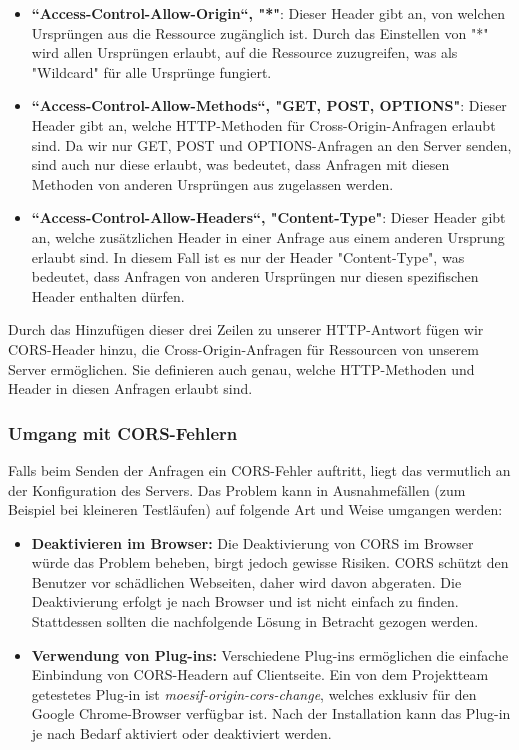 \begin{itemize}
    \item \textbf{``Access-Control-Allow-Origin``, "*"}: Dieser Header gibt an, von welchen Ursprüngen aus die Ressource zugänglich ist. Durch das Einstellen von "*" wird allen Ursprüngen erlaubt, auf die Ressource zuzugreifen, was als "Wildcard" für alle Ursprünge fungiert.
    \item \textbf{``Access-Control-Allow-Methods``, "GET, POST, OPTIONS"}: Dieser Header gibt an, welche HTTP-Methoden für Cross-Origin-Anfragen erlaubt sind. Da wir nur GET, POST und OPTIONS-Anfragen an den Server senden, sind auch nur diese erlaubt, was bedeutet, dass Anfragen mit diesen Methoden von anderen Ursprüngen aus zugelassen werden.
    \item \textbf{``Access-Control-Allow-Headers``, "Content-Type"}: Dieser Header gibt an, welche zusätzlichen Header in einer Anfrage aus einem anderen Ursprung erlaubt sind. In diesem Fall ist es nur der Header "Content-Type", was bedeutet, dass Anfragen von anderen Ursprüngen nur diesen spezifischen Header enthalten dürfen.
\end{itemize}

Durch das Hinzufügen dieser drei Zeilen zu unserer HTTP-Antwort fügen wir CORS-Header hinzu, die Cross-Origin-Anfragen für Ressourcen von unserem Server ermöglichen. Sie definieren auch genau, welche HTTP-Methoden und Header in diesen Anfragen erlaubt sind.

\subsubsection*{Umgang mit CORS-Fehlern}
Falls beim Senden der Anfragen ein CORS-Fehler auftritt, liegt das vermutlich an der Konfiguration des Servers. Das Problem kann in Ausnahmefällen (zum Beispiel bei kleineren Testläufen) auf folgende Art und Weise umgangen werden:

\begin{itemize}
    \item \textbf{Deaktivieren im Browser:} Die Deaktivierung von CORS im Browser würde das Problem beheben, birgt jedoch gewisse Risiken. CORS schützt den Benutzer vor schädlichen Webseiten, daher wird davon abgeraten. Die Deaktivierung erfolgt je nach Browser und ist nicht einfach zu finden. Stattdessen sollten die nachfolgende Lösung in Betracht gezogen werden.
    \item \textbf{Verwendung von Plug-ins:} Verschiedene Plug-ins ermöglichen die einfache Einbindung von CORS-Headern auf Clientseite. Ein von dem Projektteam getestetes Plug-in ist \textit{moesif-origin-cors-change}, welches exklusiv für den Google Chrome-Browser verfügbar ist. Nach der Installation kann das Plug-in je nach Bedarf aktiviert oder deaktiviert werden.
\end{itemize}

